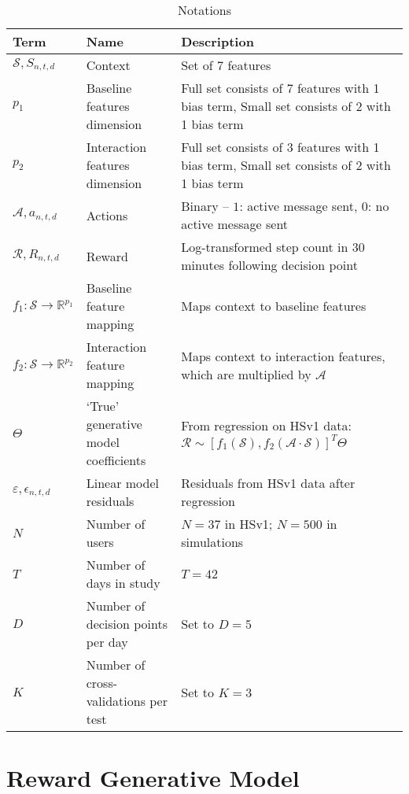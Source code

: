   \begin{table}
 \caption{Notations}
 \label{Notation Table}
 \centering \begin{tabular*}
{0.987\textwidth}
{|p{}|p{}|p{}|}
\toprule
Term & Name & Description \\
\midrule
$\mathcal{S},S_{n,t,d}$ & Context & Set of 7 features     \\
$p_1$ & Baseline features dimension & Full set consists of 7 features with 1 bias term, Small set consists of 2 with 1 bias term \\
$p_2$ & Interaction features dimension & Full set consists of 3 features with 1 bias term, Small set consists of 2 with 1 bias term \\
$\mathcal{A}, a_{n,t,d}$ & Actions &  Binary -- $1$: active message sent, $0$: no active message sent   \\
$\mathcal{R}, R_{n,t,d}$ & Reward &  Log-transformed step count in $30$ minutes following decision point  \\
$f_1 : \mathcal{S} \to \mathbb{R}^{p_1}$ & Baseline feature mapping & Maps context to baseline features \\
$f_2 : \mathcal{S} \to \mathbb{R}^{p_2}$ & Interaction feature mapping & Maps context to interaction features, which are multiplied by $\mathcal{A}$ \\
$\Theta$ & `True' generative model coefficients & From regression on HSv1 data:\newline $\mathcal{R} \sim [f_1(\mathcal{S}), f_2(\mathcal{A} \cdot \mathcal{S})]^T\Theta$ \\
$\varepsilon, \epsilon_{n,t,d}$ & Linear model residuals & Residuals from HSv1 data after regression \\
$N$ & Number of users  & $N = 37$ in HSv1; $N = 500$ in simulations \\
$T$ & Number of days in study & $T = 42$  \\
$D$ & Number of decision points per day &  Set to $D = 5$ \\
$K$ & Number of cross-validations per test & Set to $K = 3$ 
\\\bottomrule
\end{tabular*}
  \end{table}



\section{Reward Generative Model}

